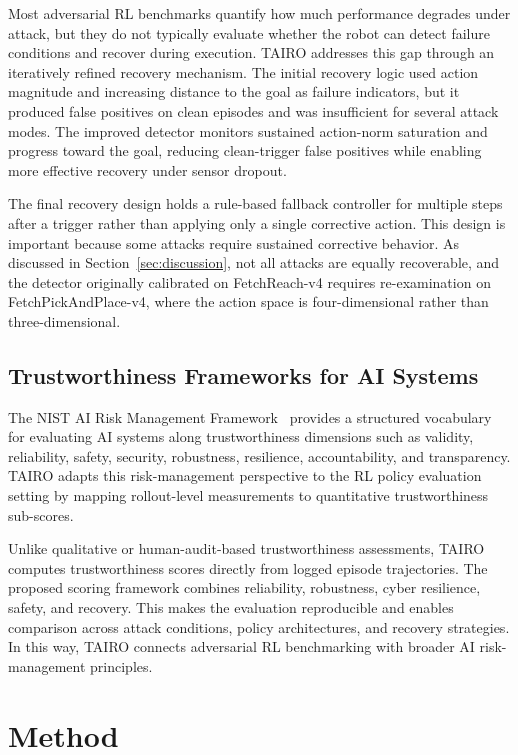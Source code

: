 \documentclass[conference]{IEEEtran}
\begin{document}
Most adversarial RL benchmarks quantify how much performance degrades under attack, but
they do not typically evaluate whether the robot can detect failure conditions and
recover during execution. TAIRO addresses this gap through an iteratively refined
recovery mechanism. The initial recovery logic used action magnitude and increasing
distance to the goal as failure indicators, but it produced false positives on clean
episodes and was insufficient for several attack modes. The improved detector monitors
sustained action-norm saturation and progress toward the goal, reducing clean-trigger
false positives while enabling more effective recovery under sensor dropout.

The final recovery design holds a rule-based fallback controller for multiple steps
after a trigger rather than applying only a single corrective action. This design is
important because some attacks require sustained corrective behavior. As discussed in
Section~\ref{sec:discussion}, not all attacks are equally recoverable, and the detector
originally calibrated on FetchReach-v4 requires re-examination on FetchPickAndPlace-v4,
where the action space is four-dimensional rather than three-dimensional.

\subsection{Trustworthiness Frameworks for AI Systems}

The NIST AI Risk Management Framework~\cite{nist2023airmf} provides a structured
vocabulary for evaluating AI systems along trustworthiness dimensions such as validity,
reliability, safety, security, robustness, resilience, accountability, and transparency.
TAIRO adapts this risk-management perspective to the RL policy evaluation setting by
mapping rollout-level measurements to quantitative trustworthiness sub-scores.

Unlike qualitative or human-audit-based trustworthiness assessments, TAIRO computes
trustworthiness scores directly from logged episode trajectories. The proposed scoring
framework combines reliability, robustness, cyber resilience, safety, and recovery.
This makes the evaluation reproducible and enables comparison across attack conditions,
policy architectures, and recovery strategies. In this way, TAIRO connects adversarial
RL benchmarking with broader AI risk-management principles.


\section{Method}
\label{sec:method}
\end{document}
